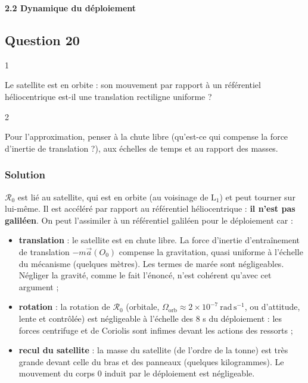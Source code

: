 \documentclass[11pt,a4paper]{article}
\providecommand{\tightlist}{\setlength{\itemsep}{0pt}\setlength{\parskip}{0pt}}
\begin{document}
\textbf{2.2 Dynamique du déploiement}

\hypertarget{question-20}{%
\subsection{Question 20}\label{question-20}}

\begin{indication}{1}

Le satellite est en orbite : son mouvement par rapport à un référentiel héliocentrique est-il une translation rectiligne uniforme ?

\end{indication}

\begin{indication}{2}

Pour l'approximation, penser à la chute libre (qu'est-ce qui compense la force d'inertie de translation ?), aux échelles de temps et au rapport des masses.

\end{indication}

\hypertarget{solution-19}{%
\subsubsection{Solution}\label{solution-19}}

\(\mathcal R_0\) est lié au satellite, qui est en orbite (au voisinage de \(\mathrm L_1\)) et peut tourner sur lui-même. Il est accéléré par rapport au référentiel héliocentrique : \textbf{il n'est pas galiléen}. On peut l'assimiler à un référentiel galiléen pour le déploiement car :

\begin{itemize}
\tightlist
\item
  \textbf{translation} : le satellite est en chute libre. La force d'inertie d'entraînement de translation \(-m\vec a(O_0)\) compense la gravitation, quasi uniforme à l'échelle du mécanisme (quelques mètres). Les termes de marée sont négligeables. Négliger la gravité, comme le fait l'énoncé, n'est cohérent qu'avec cet argument ;
\item
  \textbf{rotation} : la rotation de \(\mathcal R_0\) (orbitale, \(\Omega_{\text{orb}}\approx2\times10^{-7}\ \mathrm{rad\,s^{-1}}\), ou d'attitude, lente et contrôlée) est négligeable à l'échelle des 8 s du déploiement : les forces centrifuge et de Coriolis sont infimes devant les actions des ressorts ;
\item
  \textbf{recul du satellite} : la masse du satellite (de l'ordre de la tonne) est très grande devant celle du bras et des panneaux (quelques kilogrammes). Le mouvement du corps 0 induit par le déploiement est négligeable.
\end{itemize}
\end{document}
